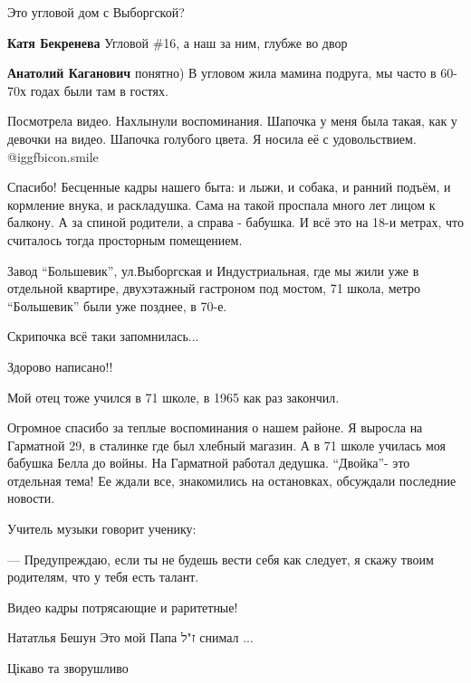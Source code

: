 \begin{itemize}
Это угловой дом с Выборгской?

\begin{itemize} %
\textbf{Катя Бекренева} Угловой \#16, а наш за ним, глубже во двор

\textbf{Анатолий Каганович} понятно) В угловом жила мамина подруга, мы часто в 60-70х годах были там в гостях.
\end{itemize} %


Посмотрела видео. Нахлынули воспоминания. Шапочка у меня была такая, как у
девочки на видео. Шапочка голубого цвета. Я носила её с удовольствием.  @igg{fbicon.smile} 


Спасибо! Бесценные кадры нашего быта: и лыжи, и собака, и ранний подъём, и
кормление внука, и раскладушка. Сама на такой проспала много лет лицом к
балкону. А за спиной родители, а справа - бабушка. И всё это на 18-и метрах,
что считалось тогда просторным помещением.

Завод \enquote{Большевик}, ул.Выборгская и Индустриальная, где мы жили уже в отдельной
квартире, двухэтажный гастроном под мостом, 71 школа, метро \enquote{Большевик} были
уже позднее, в 70-е.

Скрипочка всё таки запомнилась...

Здорово написано!!

Мой отец тоже учился в 71 школе, в 1965 как раз закончил.


Огромное спасибо за теплые воспоминания о нашем районе. Я выросла на Гарматной
29, в сталинке где был хлебный магазин. А в 71 школе училась моя бабушка Белла
до войны. На Гарматной работал дедушка. \enquote{Двойка}- это отдельная тема! Ее ждали
все, знакомились на остановках, обсуждали последние новости.



Учитель музыки говорит ученику:

— Предупреждаю, если ты не будешь вести себя как следует, я скажу твоим
родителям, что у тебя есть талант.


Видео кадры потрясающие и раритетные!

Нататлья Бешун Это мой Папа ז"ל снимал ...

Цікаво та зворушливо


\end{itemize}
